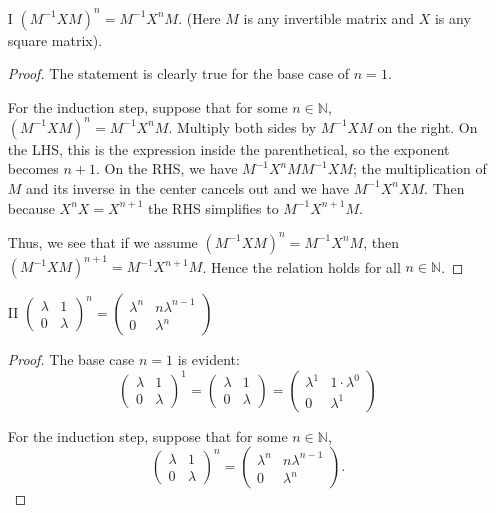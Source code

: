 \documentclass{article}
\newcommand{\N}{\mathbb{N}}
\begin{document}
\begin{enumerate}
    \item[I]
    $(M^{-1} X M)^n = M^{-1} X^n M$. (Here $M$ is any invertible matrix and $X$ is any square matrix).
    \begin{proof}
        The statement is clearly true for the base case of $n = 1$.
        
        For the induction step, suppose that for some $n \in \N$, $(M^{-1} X M)^n = M^{-1} X^n M$. Multiply both sides by $M^{-1} X M$ on the right. On the LHS, this is the expression inside the parenthetical, so the exponent becomes $n + 1$. On the RHS, we have $M^{-1} X^n M M^{-1} X M$; the multiplication of $M$ and its inverse in the center cancels out and we have $M^{-1} X^n X M$. Then because $X^n X = X^{n + 1}$ the RHS simplifies to $M^{-1} X^{n + 1} M$.

        Thus, we see that if we assume $(M^{-1} X M)^n = M^{-1} X^n M$, then $(M^{-1} X M)^{n + 1} = M^{-1} X^{n + 1} M$. Hence the relation holds for all $n \in \N$.
    \end{proof}



    \item[II]
    $\begin{pmatrix}
        \lambda & 1 \\
        0 & \lambda
    \end{pmatrix}^n =
    \begin{pmatrix}
        \lambda^n & n \lambda^{n - 1} \\
        0 & \lambda^n
    \end{pmatrix}$
    \begin{proof}
        The base case $n = 1$ is evident:
        $$\begin{pmatrix}
            \lambda & 1 \\
            0 & \lambda
        \end{pmatrix}^1 =
        \begin{pmatrix}
            \lambda & 1 \\
            0 & \lambda
        \end{pmatrix} =
        \begin{pmatrix}
            \lambda^1 & 1 \cdot \lambda^{0} \\
            0 & \lambda^1
        \end{pmatrix}$$

        For the induction step, suppose that for some $n \in \N$,
        $$\begin{pmatrix}
            \lambda & 1 \\
            0 & \lambda
        \end{pmatrix}^n =
        \begin{pmatrix}
            \lambda^n & n \lambda^{n - 1} \\
            0 & \lambda^n
        \end{pmatrix}.$$


\end{proof}
\end{enumerate}
\end{document}
